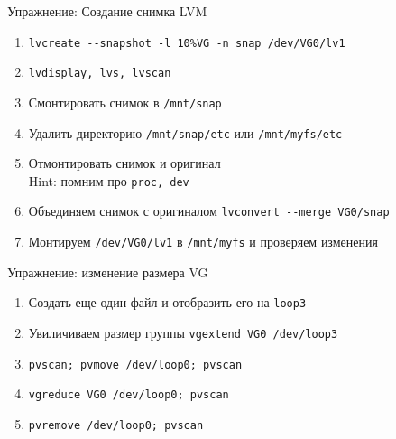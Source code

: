 \begin{frame}{Упражнение: Создание снимка LVM}
  \begin{enumerate}
    \item  {\tt lvcreate -\phantom{}-snapshot -l 10\%VG -n snap /dev/VG0/lv1}
    \item  {\tt lvdisplay, lvs, lvscan}
	\item Смонтировать снимок в {\tt /mnt/snap}
		\pause
	\item Удалить директорию {\tt /mnt/snap/etc} или {\tt /mnt/myfs/etc}
	\item Отмонтировать снимок и оригинал\\
		Hint: помним про {\tt proc, dev}
		\pause
	\item Объединяем снимок с оригиналом {\tt lvconvert -\phantom{}-merge VG0/snap}
	\item Монтируем {\tt /dev/VG0/lv1} в {\tt /mnt/myfs} и проверяем изменения
  \end{enumerate}
\end{frame}

\begin{frame}{Упражнение: изменение размера VG}
  \begin{enumerate}
	\item Создать еще один файл и отобразить его на {\tt loop3}
	\item Увиличиваем размер группы {\tt vgextend VG0 /dev/loop3}
		\pause
    \item  {\tt pvscan; pvmove /dev/loop0; pvscan}
    \item  {\tt vgreduce VG0 /dev/loop0; pvscan}
    \item  {\tt pvremove /dev/loop0; pvscan}
  \end{enumerate}
\end{frame}


